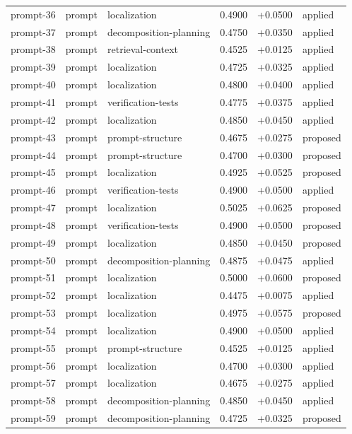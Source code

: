 \begin{center}
\begin{longtable}{llp{5.2cm}rrl}
prompt-36 & prompt & localization & 0.4900 & +0.0500 & applied \\
prompt-37 & prompt & decomposition-planning & 0.4750 & +0.0350 & applied \\
prompt-38 & prompt & retrieval-context & 0.4525 & +0.0125 & applied \\
prompt-39 & prompt & localization & 0.4725 & +0.0325 & applied \\
prompt-40 & prompt & localization & 0.4800 & +0.0400 & applied \\
prompt-41 & prompt & verification-tests & 0.4775 & +0.0375 & applied \\
prompt-42 & prompt & localization & 0.4850 & +0.0450 & applied \\
prompt-43 & prompt & prompt-structure & 0.4675 & +0.0275 & proposed \\
prompt-44 & prompt & prompt-structure & 0.4700 & +0.0300 & proposed \\
prompt-45 & prompt & localization & 0.4925 & +0.0525 & proposed \\
prompt-46 & prompt & verification-tests & 0.4900 & +0.0500 & applied \\
prompt-47 & prompt & localization & 0.5025 & +0.0625 & proposed \\
prompt-48 & prompt & verification-tests & 0.4900 & +0.0500 & proposed \\
prompt-49 & prompt & localization & 0.4850 & +0.0450 & proposed \\
prompt-50 & prompt & decomposition-planning & 0.4875 & +0.0475 & applied \\
prompt-51 & prompt & localization & 0.5000 & +0.0600 & proposed \\
prompt-52 & prompt & localization & 0.4475 & +0.0075 & applied \\
prompt-53 & prompt & localization & 0.4975 & +0.0575 & proposed \\
prompt-54 & prompt & localization & 0.4900 & +0.0500 & applied \\
prompt-55 & prompt & prompt-structure & 0.4525 & +0.0125 & applied \\
prompt-56 & prompt & localization & 0.4700 & +0.0300 & applied \\
prompt-57 & prompt & localization & 0.4675 & +0.0275 & applied \\
prompt-58 & prompt & decomposition-planning & 0.4850 & +0.0450 & applied \\
prompt-59 & prompt & decomposition-planning & 0.4725 & +0.0325 & proposed \\

\end{longtable}
\end{center}
